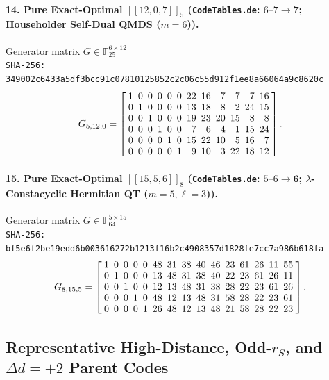\documentclass[11pt,a4paper]{article}
\theoremstyle{remark}
\begin{document}
\paragraph{14. Pure Exact-Optimal $[[12,0,7]]_{5}$ (\texttt{CodeTables.de}: $6\text{--}7 \to \mathbf{7}$; Householder Self-Dual QMDS ($m=6$)).} Generator matrix $G \in \mathbb{F}_{25}^{6 \times 12}$\\
{\footnotesize\texttt{SHA-256: 349002c6433a5df3bcc91c07810125852c2c06c55d912f1ee8a66064a9c8620c}}
{\scriptsize\[
G_{5,12,0} = \setlength{\arraycolsep}{2.5pt}\renewcommand{\arraystretch}{0.95}
\left[\begin{array}{*{12}{r}}
1 & 0 & 0 & 0 & 0 & 0 & 22 & 16 & 7 & 7 & 7 & 16 \\
0 & 1 & 0 & 0 & 0 & 0 & 13 & 18 & 8 & 2 & 24 & 15 \\
0 & 0 & 1 & 0 & 0 & 0 & 19 & 23 & 20 & 15 & 8 & 8 \\
0 & 0 & 0 & 1 & 0 & 0 & 7 & 6 & 4 & 1 & 15 & 24 \\
0 & 0 & 0 & 0 & 1 & 0 & 15 & 22 & 10 & 5 & 16 & 7 \\
0 & 0 & 0 & 0 & 0 & 1 & 9 & 10 & 3 & 22 & 18 & 12
\end{array}\right].
\]}

\paragraph{15. Pure Exact-Optimal $[[15,5,6]]_{8}$ (\texttt{CodeTables.de}: $5\text{--}6 \to \mathbf{6}$; $\lambda$-Constacyclic Hermitian QT ($m=5, \ell=3$)).} Generator matrix $G \in \mathbb{F}_{64}^{5 \times 15}$\\
{\footnotesize\texttt{SHA-256: bf5e6f2be19edd6b003616272b1213f16b2c4908357d1828fe7cc7a986b618fa}}
{\scriptsize\[
G_{8,15,5} = \setlength{\arraycolsep}{2.5pt}\renewcommand{\arraystretch}{0.95}
\left[\begin{array}{*{15}{r}}
1 & 0 & 0 & 0 & 0 & 48 & 31 & 38 & 40 & 46 & 23 & 61 & 26 & 11 & 55 \\
0 & 1 & 0 & 0 & 0 & 13 & 48 & 31 & 38 & 40 & 22 & 23 & 61 & 26 & 11 \\
0 & 0 & 1 & 0 & 0 & 12 & 13 & 48 & 31 & 38 & 28 & 22 & 23 & 61 & 26 \\
0 & 0 & 0 & 1 & 0 & 48 & 12 & 13 & 48 & 31 & 58 & 28 & 22 & 23 & 61 \\
0 & 0 & 0 & 0 & 1 & 26 & 48 & 12 & 13 & 48 & 21 & 58 & 28 & 22 & 23
\end{array}\right].
\]}


\subsection{Representative High-Distance, Odd-\texorpdfstring{$r_S$}{r\_S}, and \texorpdfstring{$\Delta d = +2$}{Delta d = +2} Parent Codes}
\end{document}
